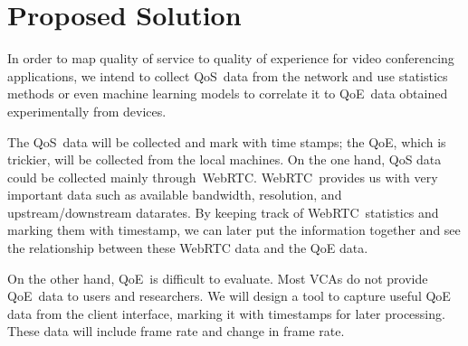 \section{Proposed Solution}\label{proposed-solution}
    In order to map quality of service to quality of experience for video conferencing applications, we intend to collect QoS~data from the network and use statistics methods or even machine learning models to correlate it to QoE~data obtained experimentally from devices.

    The QoS~data will be collected and mark with time stamps; the QoE, which is trickier, will be collected from the local machines. On the one hand, QoS data could be collected mainly through~WebRTC. WebRTC~provides us with very important data such as available bandwidth, resolution, and upstream/downstream datarates. By keeping track of WebRTC~statistics and marking them with timestamp, we can later put the information together and see the relationship between these WebRTC data and the QoE data.

    On the other hand, QoE~is difficult to evaluate. Most VCAs do not provide QoE~data to users and researchers. We will design a tool to capture useful QoE data from the client interface, marking it with timestamps for later processing. These data will include frame rate and change in frame rate.
